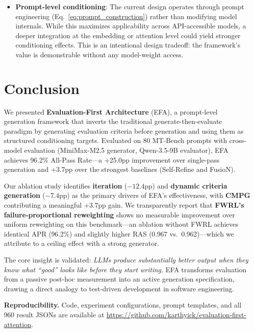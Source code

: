 \documentclass[11pt]{article}
\newcommand{\efa}{\textsc{EFA}}  %
\newcommand{\cmpg}{\textsc{CMPG}}
\newcommand{\fwrl}{\textsc{FWRL}}
\begin{document}
\begin{itemize}[leftmargin=*]
    \item \textbf{Prompt-level conditioning}: The current design operates through prompt engineering (Eq.~\ref{eq:prompt_construction}) rather than modifying model internals. While this maximizes applicability across API-accessible models, a deeper integration at the embedding or attention level could yield stronger conditioning effects. This is an intentional design tradeoff: the framework's value is demonstrable without any model-weight access.
\end{itemize}

\section{Conclusion}

We presented \textbf{Evaluation-First Architecture} (\efa{}), a prompt-level generation framework that inverts the traditional generate-then-evaluate paradigm by generating evaluation criteria before generation and using them as structured conditioning targets. Evaluated on 80 MT-Bench prompts with cross-model evaluation (MiniMax-M2.5 generator, Qwen-3.5-9B evaluator), \efa{} achieves 96.2\% All-Pass Rate---a +25.0pp improvement over single-pass generation and +3.7pp over the strongest baselines (Self-Refine and FusioN).

Our ablation study identifies \textbf{iteration} ($-12.4$pp) and \textbf{dynamic criteria generation} ($-7.4$pp) as the primary drivers of \efa{}'s effectiveness, with \textbf{\cmpg{}} contributing a meaningful $+3.7$pp gain. We transparently report that \textbf{\fwrl{}'s failure-proportional reweighting} shows no measurable improvement over uniform reweighting on this benchmark---an ablation without \fwrl{} achieves identical APR (96.2\%) and slightly higher RAS (0.967 vs.\ 0.962)---which we attribute to a ceiling effect with a strong generator.

The core insight is validated: \emph{LLMs produce substantially better output when they know what ``good'' looks like before they start writing.} \efa{} transforms evaluation from a passive post-hoc measurement into an active generation specification, drawing a direct analogy to test-driven development in software engineering.

\textbf{Reproducibility.} Code, experiment configurations, prompt templates, and all 960 result JSONs are available at \url{https://github.com/karthyick/evaluation-first-attention}.
\end{document}
